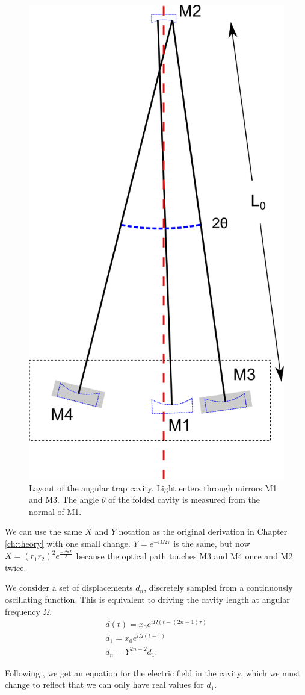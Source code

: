 \begin{figure}[htp]
\vspace{5pt}
\begin{center}
\includegraphics[width=.5\textwidth]{figures/Angular/angularLayout}
\end{center}
\caption[Folded cavity layout]{%
\label{f:angularLayout}
Layout of the angular trap cavity. Light enters through mirrors M1 and M3. The angle $\theta$ of the folded cavity is measured from the normal of M1. 
}
\end{figure}

We can use the same $X$ and $Y$ notation as the original derivation in Chapter \ref{ch:theory} with one small change. $Y=e^{-i\Omega 2\tau}$ is the same, but now $X=(r_1r_2)^2 e^{\frac{-i2\pi L}{\lambda}}$ because the optical path touches M3 and M4 once and M2 twice.

We consider a set of displacements $d_n$, discretely sampled from a continuously oscillating function. This is equivalent to driving the cavity length at angular frequency $\Omega$.  
\begin{eqnarray}
d(t) = x_0e^{i \Omega(t-(2n-1)\tau)}\\
d_1 = x_0e^{i \Omega(t-\tau)}\\
d_n = Y^{2n-2}d_1  .
\end{eqnarray}

Following \cite{Perreca14}, we get an equation for the electric field in the cavity, which we must change to reflect that we can only have real values for $d_1$.

